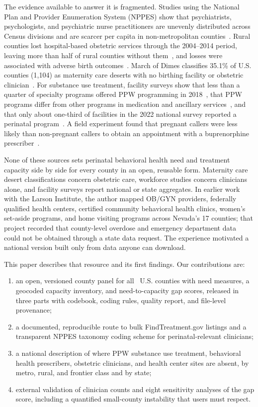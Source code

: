 \documentclass[10pt,twocolumn,letterpaper]{article}
\begin{document}
The evidence available to answer it is fragmented. Studies using the National Plan and Provider Enumeration System (NPPES) show that psychiatrists, psychologists, and psychiatric nurse practitioners are unevenly distributed across Census divisions and are scarcer per capita in non-metropolitan counties~\cite{andrilla2018}. Rural counties lost hospital-based obstetric services through the 2004--2014 period, leaving more than half of rural counties without them~\cite{hung2017}, and losses were associated with adverse birth outcomes~\cite{kozhimannil2018}. March of Dimes classifies 35.1\% of U.S. counties (1,104) as maternity care deserts with no birthing facility or obstetric clinician~\cite{mod2024}. For substance use treatment, facility surveys show that less than a quarter of specialty programs offered PPW programming in 2018~\cite{macpac2020}, that PPW programs differ from other programs in medication and ancillary services~\cite{meinhofer2020}, and that only about one-third of facilities in the 2022 national survey reported a perinatal program~\cite{lombardi2025}. A field experiment found that pregnant callers were less likely than non-pregnant callers to obtain an appointment with a buprenorphine prescriber~\cite{patrick2020}.

None of these sources sets perinatal behavioral health need and treatment capacity side by side for every county in an open, reusable form. Maternity care desert classifications concern obstetric care, workforce studies concern clinicians alone, and facility surveys report national or state aggregates. In earlier work with the Larson Institute, the author mapped OB/GYN providers, federally qualified health centers, certified community behavioral health clinics, women's set-aside programs, and home visiting programs across Nevada's 17 counties; that project recorded that county-level overdose and emergency department data could not be obtained through a state data request. The experience motivated a national version built only from data anyone can download.

This paper describes that resource and its first findings. Our contributions are:
\begin{enumerate}
\item an open, versioned county panel for all \NCounties\ U.S. counties with need measures, a geocoded capacity inventory, and need-to-capacity gap scores, released in three parts with codebook, coding rules, quality report, and file-level provenance;
\item a documented, reproducible route to bulk FindTreatment.gov listings and a transparent NPPES taxonomy coding scheme for perinatal-relevant clinicians;
\item a national description of where PPW substance use treatment, behavioral health prescribers, obstetric clinicians, and health center sites are absent, by metro, rural, and frontier class and by state;
\item external validation of clinician counts and eight sensitivity analyses of the gap score, including a quantified small-county instability that users must respect.
\end{enumerate}
\end{document}
